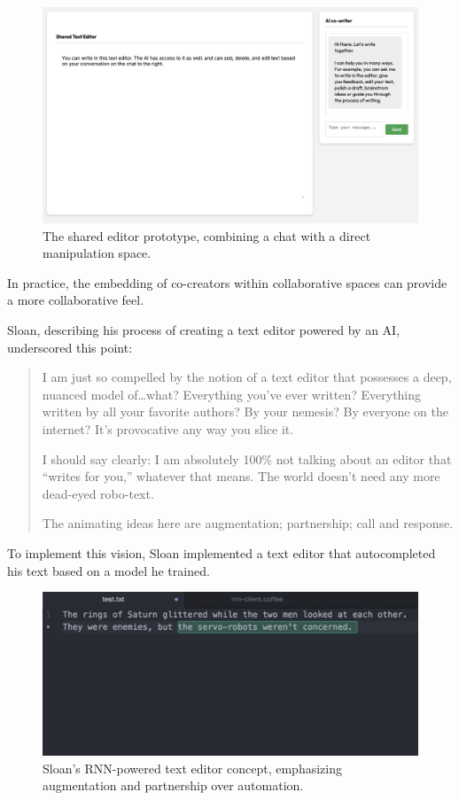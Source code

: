 \begin{figure}[H]
    \centering
    \includegraphics[width=1\linewidth]{sharededitor.png}
    \caption{The shared editor prototype, combining a chat with a direct manipulation space.}
    \label{fig:shared-editor}
\end{figure}

In practice, the embedding of co-creators within collaborative spaces can provide a more collaborative feel.

Sloan, describing his process of creating a text editor powered by an AI, underscored this point:
\begin{quote}
I am just so compelled by the notion of a text editor that possesses a deep, nuanced model of…what? Everything you’ve ever written? Everything written by all your favorite authors? By your nemesis? By everyone on the internet? It’s provocative any way you slice it.

I should say clearly: I am absolutely 100\% not talking about an editor that “writes for you,” whatever that means. The world doesn’t need any more dead-eyed robo-text.

The animating ideas here are augmentation; partnership; call and response.
\end{quote}
To implement this vision, Sloan implemented a text editor that autocompleted his text based on a model he trained. 

\begin{figure}
    \centering
    \includegraphics[width=1\linewidth]{rnn.png}
    \caption{Sloan's RNN-powered text editor concept, emphasizing augmentation and partnership over automation.}
    \label{fig:enter-label}
\end{figure}



